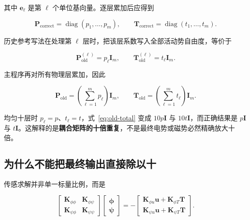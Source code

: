 \documentclass[UTF8,fontset=windows,12pt,a4paper]{ctexart}
\begin{document}
其中 $\mathbf e_\ell$ 是第 $\ell$ 个单位基向量。逐层累加后应得到

\begin{equation}
\mathbf P_{\mathrm{correct}}=\operatorname{diag}(p_1,\ldots,p_m),\qquad
\mathbf T_{\mathrm{correct}}=\operatorname{diag}(t_1,\ldots,t_m).
\label{eq:correct-total}
\end{equation}

历史参考写法在处理第 $\ell$ 层时，把该层系数写入全部活动势自由度，等价于

\begin{equation}
\mathbf P^{(\ell)}_{\mathrm{old}}=p_\ell\mathbf I_m,\qquad
\mathbf T^{(\ell)}_{\mathrm{old}}=t_\ell\mathbf I_m.
\end{equation}

主程序再对所有物理层累加，因此

\begin{equation}
\mathbf P_{\mathrm{old}}=\left(\sum_{\ell=1}^{m}p_\ell\right)\mathbf I_m,
\qquad
\mathbf T_{\mathrm{old}}=\left(\sum_{\ell=1}^{m}t_\ell\right)\mathbf I_m.
\label{eq:old-total}
\end{equation}

均匀十层时 $p_\ell=p$、$t_\ell=t$，式~\eqref{eq:old-total} 变成 $10p\mathbf I$ 与 $10t\mathbf I$，而正确结果是 $p\mathbf I$ 与 $t\mathbf I$。这解释的是\textbf{耦合矩阵的十倍重复}，不是最终电势或磁势必然精确放大十倍。

\subsection{为什么不能把最终输出直接除以十}

传感求解并非单一标量比例，而是

\begin{equation}
\begin{bmatrix}
\mathbf K_{\phi\phi} & \mathbf K_{\phi\psi}\\
\mathbf K_{\psi\phi} & \mathbf K_{\psi\psi}
\end{bmatrix}
\begin{bmatrix}\bm\phi\\\bm\psi\end{bmatrix}
=-
\begin{bmatrix}
\mathbf K_{\phi u}\mathbf u+\mathbf K_{\phi T}\mathbf T\\
\mathbf K_{\psi u}\mathbf u+\mathbf K_{\psi T}\mathbf T
\end{bmatrix}.
\label{eq:sensor-block}
\end{equation}
\end{document}
